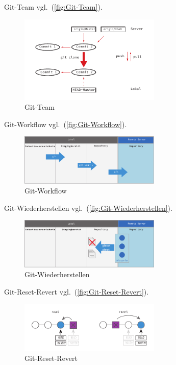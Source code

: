 Git-Team vgl.~(\autoref{fig:Git-Team}).

\begin{figure}[!hb]%
\centering
\includegraphics[width=0.6\textwidth]{Grafiken/Git-Team.pdf}
\caption{Git-Team}
\label{fig:Git-Team}%
\end{figure}

Git-Workflow vgl.~(\autoref{fig:Git-Workflow}).

\begin{figure}[!hb]%
\centering
\includegraphics[width=0.6\textwidth]{Grafiken/Git-Workflow.pdf}
\caption{Git-Workflow}
\label{fig:Git-Workflow}%
\end{figure}

Git-Wiederherstellen vgl.~(\autoref{fig:Git-Wiederherstellen}).

\begin{figure}[!hb]%
\centering
\includegraphics[width=0.6\textwidth]{Grafiken/Git-Wiederherstellen.pdf}
\caption{Git-Wiederherstellen}
\label{fig:Git-Wiederherstellen}%
\end{figure}

Git-Reset-Revert vgl.~(\autoref{fig:Git-Reset-Revert}).

\begin{figure}[!hb]%
\centering
\includegraphics[width=0.6\textwidth]{Grafiken/Git-Reset-Revert.pdf}
\caption{Git-Reset-Revert}
\label{fig:Git-Reset-Revert}%
\end{figure}

